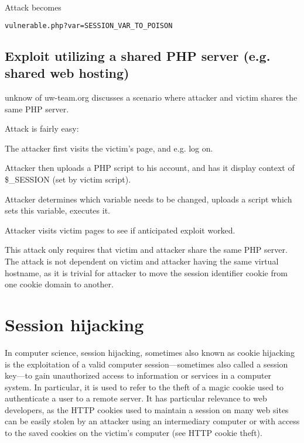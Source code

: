 Attack becomes

\begin{lstlisting}[language=bash]
vulnerable.php?var=SESSION_VAR_TO_POISON
\end{lstlisting}

\section{Exploit utilizing a shared PHP server (e.g. shared web hosting)}

unknow of uw-team.org discusses a scenario where attacker and victim shares the same PHP server.

Attack is fairly easy:

\begin{compactitem}
\item The attacker first visits the victim's page, and e.g. log on.
\item Attacker then uploads a PHP script to his account, and has it display context of \$\_SESSION (set by victim script).
\item Attacker determines which variable needs to be changed, uploads a script which sets this variable, executes it.
\item Attacker visits victim pages to see if anticipated exploit worked.
\end{compactitem}


This attack only requires that victim and attacker share the same PHP server. The attack is not dependent on victim and attacker having the same virtual hostname, as it is trivial for attacker to move the session identifier cookie from one cookie domain to another.




\chapter{Session hijacking}


In computer science, session hijacking\cite{session_hijacking}, sometimes also known as cookie hijacking is the exploitation of a valid computer session—sometimes also called a session key—to gain unauthorized access to information or services in a computer system. In particular, it is used to refer to the theft of a magic cookie used to authenticate a user to a remote server. It has particular relevance to web developers, as the HTTP cookies used to maintain a session on many web sites can be easily stolen by an attacker using an intermediary computer or with access to the saved cookies on the victim's computer (see HTTP cookie theft).


